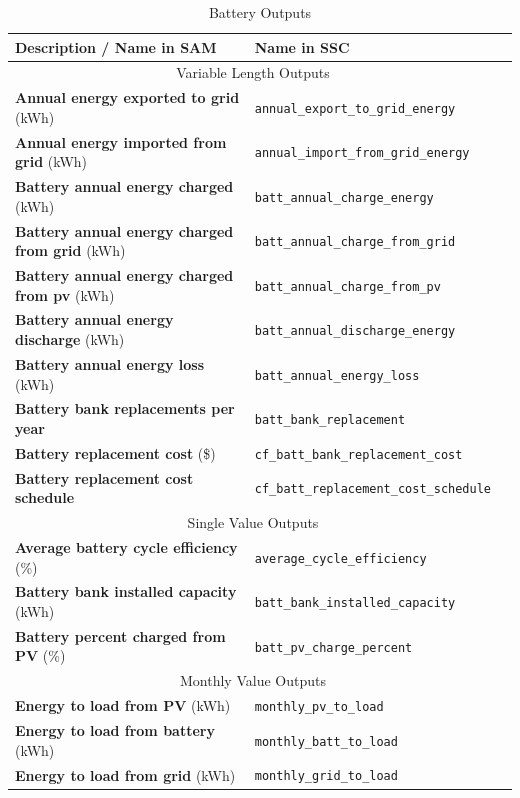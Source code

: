 \documentclass[12pt,letterpaper]{article}
\begin{document}
\begin{table}
\begin{center}
\caption{Battery Outputs}
\begin{tabular}{lll}
\midrule
Description / \textbf{Name in SAM} & Name in SSC \\
\midrule
\multicolumn{2}{c}{Variable Length Outputs}\\
\textbf{Annual energy exported to grid} (kWh) & \texttt{annual\_export\_to\_grid\_energy} \\
\textbf{Annual energy imported from grid} (kWh) & \texttt{annual\_import\_from\_grid\_energy} \\
\textbf{Battery annual energy charged} (kWh) & \texttt{batt\_annual\_charge\_energy} \\
\textbf{Battery annual energy charged from grid} (kWh) & \texttt{batt\_annual\_charge\_from\_grid} \\
\textbf{Battery annual energy charged from pv} (kWh) & \texttt{batt\_annual\_charge\_from\_pv} \\
\textbf{Battery annual energy discharge} (kWh) & \texttt{batt\_annual\_discharge\_energy} \\
\textbf{Battery annual energy loss} (kWh) & \texttt{batt\_annual\_energy\_loss} \\
\textbf{Battery bank replacements per year} & \texttt{batt\_bank\_replacement} \\
\textbf{Battery replacement cost} (\$)& \texttt{cf\_batt\_bank\_replacement\_cost} \\
\textbf{Battery replacement cost schedule} & \texttt{cf\_batt\_replacement\_cost\_schedule} \\
\midrule
\multicolumn{2}{c}{Single Value Outputs}\\
\textbf{Average battery cycle efficiency} (\%)& \texttt{average\_cycle\_efficiency} \\
\textbf{Battery bank installed capacity} (kWh)& \texttt{batt\_bank\_installed\_capacity} \\
\textbf{Battery percent charged from PV} (\%)& \texttt{batt\_pv\_charge\_percent} \\
\midrule
\multicolumn{2}{c}{Monthly Value Outputs}\\
\textbf{Energy to load from PV} (kWh) & \texttt{monthly\_pv\_to\_load} \\
\textbf{Energy to load from battery} (kWh) & \texttt{monthly\_batt\_to\_load} \\
\textbf{Energy to load from grid} (kWh) & \texttt{monthly\_grid\_to\_load} \\

\end{tabular}
\end{center}
\end{table}
\end{document}

